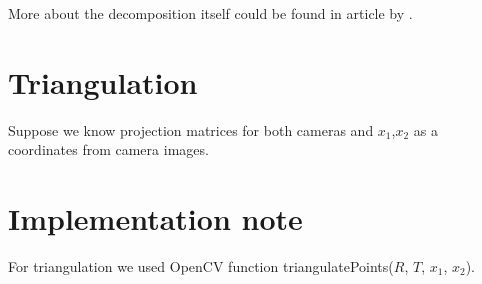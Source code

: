 More about the decomposition itself could be found in article by \citet{computervisionblog}.

\section{Triangulation}
Suppose we know projection matrices for both cameras and $x_1$,$x_2$ as a
coordinates from camera images.

\section{Implementation note}
For triangulation we used OpenCV function triangulatePoints($R$, $T$, $x_1$, $x_2$).
